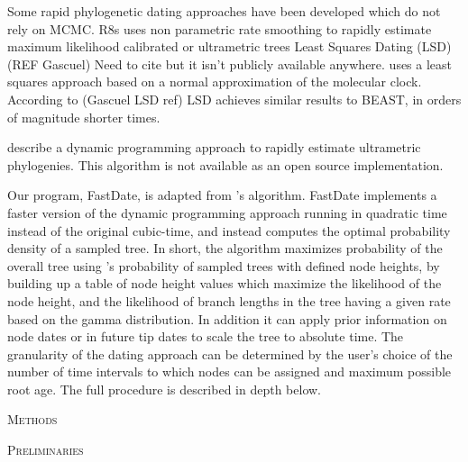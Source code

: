 \documentclass{llncs}
\newcommand{\ejmcomment}[1]{{\color{green} #1}}
\renewcommand{\section}[1]{%
\bigskip
\begin{center}
\begin{Large}
\normalfont\scshape #1
\medskip
\end{Large}
\end{center}}
\begin{document}
Some rapid phylogenetic dating approaches have been developed which do not rely on MCMC.
R8s uses non parametric rate smoothing to rapidly estimate maximum likelihood calibrated or ultrametric trees \citep{Sanderson2003}
Least Squares Dating (LSD) (REF Gascuel) 
\ejmcomment{Need to cite but it isn't publicly available anywhere.}
uses a least squares approach based on a normal approximation of the molecular clock.
According to (Gascuel LSD ref) LSD achieves similar results to BEAST, in orders of magnitude shorter times.

\cite{Akerborg2008} describe a dynamic programming approach to 
rapidly estimate ultrametric phylogenies. 
This algorithm is not available as an open source implementation.

Our program, FastDate, is adapted from \cite{Akerborg2008}'s algorithm.
FastDate implements a faster version of the dynamic programming approach running 
in quadratic time instead of the original cubic-time, and instead computes the 
optimal probability density of a sampled tree.
In short, the algorithm maximizes probability of the overall tree using \cite{Stadler2010}'s 
probability of sampled trees with defined node heights,
by building up a table of node height values which maximize the likelihood of 
the node height,  and the likelihood of branch lengths in the tree 
having a given rate based on the gamma distribution.
In addition it can apply prior information on node dates or \ejmcomment{in future} tip dates to scale the tree to
absolute time.
The granularity of the dating approach can be determined by the user's choice of the number of time intervals to which 
nodes can be assigned and maximum possible root age.
The full procedure is described in depth below.

\section{Methods}

\section {Preliminaries}
%
%
\end{document}

